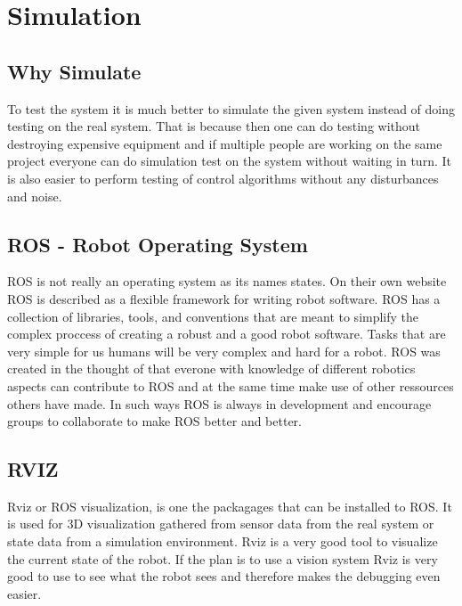 
\section*{Simulation}
\subsection*{Why Simulate}
To test the system it is much better to simulate the given system instead of doing testing on the real system. That is because then one can do testing without destroying expensive equipment and if multiple people are working on the same project everyone can do simulation test on the system without waiting in turn. It is also easier to perform testing of control algorithms without any disturbances and noise. 

\subsection*{ROS - Robot Operating System}
ROS is not really an operating system as its names states. On their own website ROS is described as a flexible framework for writing robot software. ROS has a collection of libraries, tools, and conventions that are meant to simplify the complex proccess of creating a robust and a good robot software. Tasks that are very simple for us humans will be very complex and hard for a robot. ROS was created in the thought of that everone with knowledge of different robotics aspects can contribute to ROS and at the same time make use of other ressources others have made. In such ways ROS is always in development and encourage groups to collaborate to make ROS better and better. 


\subsection*{RVIZ}
Rviz or ROS visualization, is one the packagages that can be installed to ROS. It is used for 3D visualization gathered from sensor data from the real system or state data from a simulation environment. Rviz is a very good tool to visualize the current state of the robot. If the plan is to use a vision system Rviz is very good to use to see what the robot sees and therefore makes the debugging even easier. 





